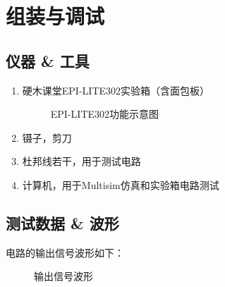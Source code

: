 \documentclass[UTF8,titlepage,a4paper]{ctexart}
\numberwithin{figure}{section}
\begin{document}
\section{组装与调试}
\subsection{仪器 \& 工具}
\begin{enumerate}
    \item 硬木课堂EPI-LITE302实验箱（含面包板）
    \begin{figure}[H]
    \centering
     \caption{EPI-LITE302功能示意图}
     \label{}
    \end{figure}
    \item 镊子，剪刀
    \item 杜邦线若干，用于测试电路
    \item 计算机，用于Multisim仿真和实验箱电路测试
\end{enumerate}

\subsection{测试数据 \& 波形}

电路的输出信号波形如下：
\begin{figure}[H]
\centering
 \caption{输出信号波形}
 \label{}
\end{figure}
\end{document}
